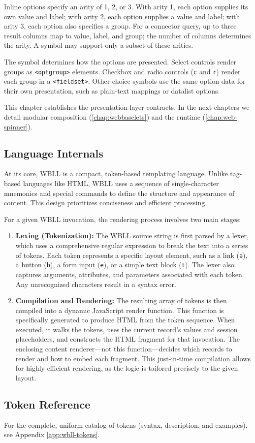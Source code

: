 Inline options specify an arity of 1, 2, or 3. With arity 1, each option supplies its own value and label; with arity 2, each option supplies a value and label; with arity 3, each option also specifies a group. For a connector query, up to three result columns map to value, label, and group; the number of columns determines the arity. A symbol may support only a subset of these arities.

The symbol determines how the options are presented. Select controls render groups as \texttt{<optgroup>} elements. Checkbox and radio controls (\texttt{c} and \texttt{r}) render each group in a \texttt{<fieldset>}. Other choice symbols use the same option data for their own presentation, such as plain-text mappings or datalist options.

This chapter establishes the presentation-layer contracts. In the next chapters we detail modular composition (\cref{chap:webbaselets}) and the runtime (\cref{chap:web-spinner}).

\subsection{Language Internals}

At its core, WBLL is a compact, token-based templating language. Unlike tag-based languages like HTML, WBLL uses a sequence of single-character mnemonics and special commands to define the structure and appearance of content. This design prioritizes conciseness and efficient processing.

For a given WBLL invocation, the rendering process involves two main stages:

\begin{enumerate}
    \item \textbf{Lexing (Tokenization):} The WBLL source string is first parsed by a lexer, which uses a comprehensive regular expression to break the text into a series of tokens. Each token represents a specific layout element, such as a link (\texttt{a}), a button (\texttt{b}), a form input (\texttt{e}), or a simple text block (\texttt{t}). The lexer also captures arguments, attributes, and parameters associated with each token. Any unrecognized characters result in a syntax error.
    
    \item \textbf{Compilation and Rendering:} The resulting array of tokens is then compiled into a dynamic JavaScript render function. This function is specifically generated to produce HTML from the token sequence. When executed, it walks the tokens, uses the current record's values and session placeholders, and constructs the HTML fragment for that invocation. The enclosing content renderer—not this function—decides which records to render and how to embed each fragment. This just-in-time compilation allows for highly efficient rendering, as the logic is tailored precisely to the given layout.
\end{enumerate}


\subsection{Token Reference}

For the complete, uniform catalog of tokens (syntax, description, and examples), see Appendix \ref{app:wbll-tokens}.
